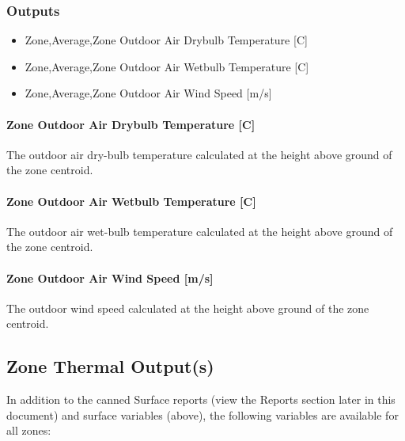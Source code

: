\subsubsection{Outputs}\label{outputs-037}

\begin{itemize}
\item
  Zone,Average,Zone Outdoor Air Drybulb Temperature {[}C{]}
\item
  Zone,Average,Zone Outdoor Air Wetbulb Temperature {[}C{]}
\item
  Zone,Average,Zone Outdoor Air Wind Speed {[}m/s{]}
\end{itemize}

\paragraph{Zone Outdoor Air Drybulb Temperature {[}C{]}}\label{zone-outdoor-air-drybulb-temperature-c-000}

The outdoor air dry-bulb temperature calculated at the height above ground of the zone centroid.

\paragraph{Zone Outdoor Air Wetbulb Temperature {[}C{]}}\label{zone-outdoor-air-wetbulb-temperature-c-000}

The outdoor air wet-bulb temperature calculated at the height above ground of the zone centroid.

\paragraph{Zone Outdoor Air Wind Speed {[}m/s{]}}\label{zone-outdoor-air-wind-speed-ms-000}

The outdoor wind speed calculated at the height above ground of the zone centroid.

\subsection{Zone Thermal Output(s)}\label{zone-thermal-outputs}

In addition to the canned Surface reports (view the Reports section later in this document) and surface variables (above), the following variables are available for all zones:

